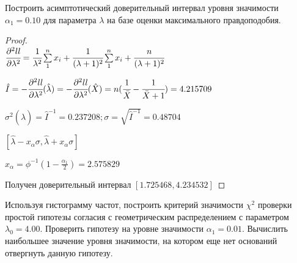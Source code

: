 \begin{problem}
	Построить асимптотический доверительный интервал уровня значимости $\alpha_1=0.10$ для параметра $\lambda$ на базе оценки максимального правдоподобия.	
\end{problem}

\begin{proof}
        $ $ \\
        
		$\cfrac{\partial^2ll}{\partial\lambda^2}=\cfrac{1}{\lambda^2}\sum\limits_1^nx_i+\cfrac{1}{(\lambda+1)^2}\sum\limits_1^nx_i+\cfrac{n}{(\lambda+1)^2}$ 
		
		$\hat{I}=-\cfrac{\partial^2ll}{\partial\lambda^2}(\hat{\lambda})=-\cfrac{\partial^2ll}{\partial\lambda^2}(\hat{X})=n(\cfrac{1}{\bar{X}}-\cfrac{1}{\bar{X}+1})=4.215709$ 
		
		$\sigma^2(\hat{\lambda})=\hat{I}^{-1}=0.237208; \sigma=\sqrt{\hat{I}^{-1}}=0.48704$ 
		
		$[\hat{\lambda}-x_{\alpha}\sigma, \hat{\lambda}+x_{\alpha}\sigma]$ 
		
		$x_{\alpha}=\phi^{-1}(1-\frac{\alpha_1}{2})=2.575829$ 
		
		$\text{Получен доверительный интервал } [1.725468, 4.234532]$
\end{proof}


\begin{problem}
	Используя гистограмму частот, построить критерий значимости $\chi^2$ проверки простой гипотезы согласия с геометрическим распределением с параметром $\lambda_0=4.00$. Проверить гипотезу на уровне значимости $\alpha_1=0.01$. Вычислить наибольшее значение уровня значимости, на котором еще нет оснований отвергнуть данную гипотезу. 
\end{problem}

